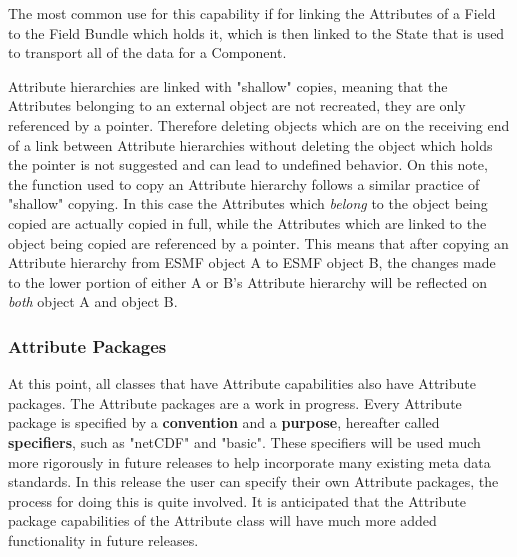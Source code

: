 The most common use for this capability if for linking the Attributes of a Field to the Field Bundle which holds it, which is then linked to the State that is used to transport all of the data for a Component.  

Attribute hierarchies are linked with "shallow" copies, meaning that the Attributes belonging to an external object are not recreated, they are only referenced by a pointer.  Therefore deleting objects which are on the receiving end of a link between Attribute hierarchies without deleting the object which holds the pointer is not suggested and can lead to undefined behavior.  On this note, the function used to copy an Attribute hierarchy follows a similar practice of "shallow" copying.  In this case the Attributes which {\it belong} to the object being copied are actually copied in full, while the Attributes which are linked to the object being copied are referenced by a pointer.  This means that after copying an Attribute hierarchy from ESMF object A to ESMF object B, the changes made to the lower portion of either A or B's Attribute hierarchy will be reflected on {\it both} object A and object B.

\subsubsection{Attribute Packages}

At this point, all classes that have Attribute capabilities also have Attribute packages.  The Attribute packages are a work in progress.  Every Attribute package is specified by a {\bf convention} and a {\bf purpose}, hereafter called {\bf specifiers}, such as "netCDF" and "basic".  These specifiers will be used much more rigorously in future releases to help incorporate many existing meta data standards.  In this release the user can specify their own Attribute packages, the process for doing this is quite involved.  It is anticipated that the Attribute package capabilities of the Attribute class will have much more added functionality in future releases.


